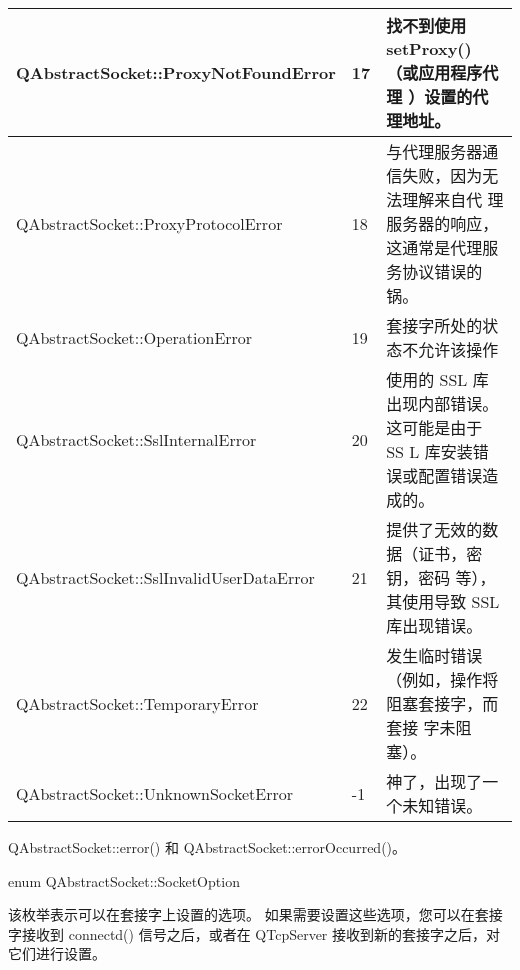 \begin{longtable}{|m{20em}|m{2em}|m{19em}|}
\hline
QAbstractSocket::ProxyNotFoundError&	17&	找不到使用 setProxy() （或应用程序代理
）设置的代理地址。\\
\hline
QAbstractSocket::ProxyProtocolError&	18&	与代理服务器通信失败，因为无法理解来自代
理服务器的响应，这通常是代理服务协议错误的锅。\\
\hline
QAbstractSocket::OperationError&	19&	套接字所处的状态不允许该操作\\
\hline
QAbstractSocket::SslInternalError&	20&	使用的 SSL 库出现内部错误。 这可能是由于 SS
L 库安装错误或配置错误造成的。\\
\hline
QAbstractSocket::SslInvalidUserDataError&	21&	提供了无效的数据（证书，密钥，密码
等），其使用导致 SSL 库出现错误。\\
\hline
QAbstractSocket::TemporaryError&	22&	发生临时错误（例如，操作将阻塞套接字，而套接
字未阻塞）。\\
\hline
QAbstractSocket::UnknownSocketError&	-1&	神了，出现了一个未知错误。\\
\hline
\end{longtable}

\begin{seeAlso}
QAbstractSocket::error() 和 QAbstractSocket::errorOccurred()。
\end{seeAlso}


\splitLine

enum QAbstractSocket::SocketOption

该枚举表示可以在套接字上设置的选项。 如果需要设置这些选项，您可以在套接字接收到 connectd() 信号之后，或者在 QTcpServer 接收到新的套接字之后，对它们进行设置。

